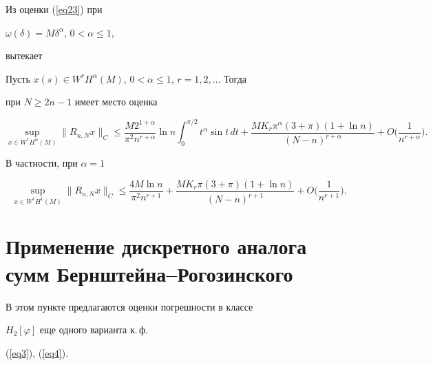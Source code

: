 Из оценки (\ref{eq23}) при


$\omega(\delta)=M\delta^\alpha,\,0<\alpha\leq1$,


вытекает





\begin{cor}


Пусть $x(s)\in


W^rH^\alpha(M)$, $0<\alpha\leq1$, $r=1,2,\dotsc$ Тогда


при $N\geq2n-1$ имеет место оценка


$$


\sup_{x\in


W^rH^\alpha(M)}\| R_{n,N}x\|_C \leq


\frac{M 2^{1+\alpha}}{\pi^2 n^{r+\alpha}}\ln n


\int_0^{\pi/2}t^\alpha\sin t\, dt +


\frac{MK_r\pi^\alpha(3+\pi)(1+\ln n)}{


(N-n)^{r+\alpha}} +


O\bigg(\frac{1}{n^{r+\alpha}}\bigg).


$$


В частности, при $\alpha=1$


$$


\sup_{x\in


W^rH^1(M)}\| R_{n,N}x\|_C \leq \frac{4M\ln


n}{\pi^2 n^{r+1}}+ \frac{MK_r\pi(3+\pi)(1+\ln


n)}{(N-n)^{r+1}} +


O\bigg(\frac{1}{n^{r+1}}\bigg).


$$


\end{cor}








\section{Применение дискретного аналога сумм Бернштейна--Рогозинского}








В этом пункте предлагаются оценки погрешности в классе


$H_2[\varphi]$ еще одного варианта к.\,ф.


(\ref{eq3}), (\ref{eq4}).





